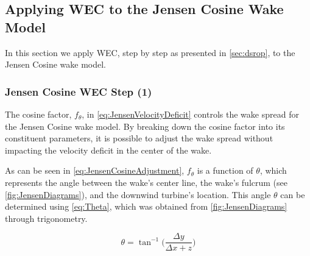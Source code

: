 \documentclass[a4paper]{jpconf}
\begin{document}
\subsection{Applying WEC to the Jensen Cosine Wake Model}
In this section we apply WEC, step by step as presented in \cref{sec:dsrop}, to the Jensen Cosine wake model.  


\subsubsection{Jensen Cosine WEC Step (1)}

The cosine factor, $f_\theta$, in \cref{eq:JensenVelocityDeficit} controls the wake spread for the Jensen Cosine wake model. By breaking down the cosine factor into its constituent parameters, it is possible to adjust the wake spread without impacting the velocity deficit in the center of the wake.


As can be seen in \cref{eq:JensenCosineAdjustment}, $f_\theta$ is a function of $\theta$, which represents the angle between the wake's center line, the wake's fulcrum (see \cref{fig:JensenDiagrams}), and the downwind turbine's location. This angle $\theta$ can be determined using \cref{eq:Theta}, which was obtained from \cref{fig:JensenDiagrams} through trigonometry.

\begin{equation}
\theta = \tan^{-1}\Big( \frac{\Delta y}{\Delta x + z} \Big)
\label{eq:Theta}
\end{equation}
\end{document}
